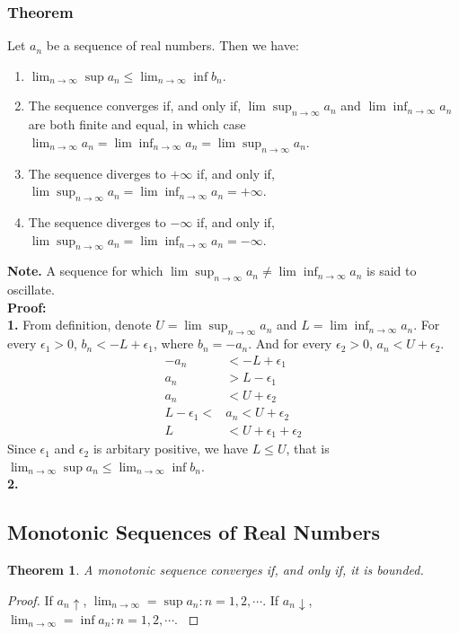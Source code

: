 \documentclass{article}
\newtheorem{theorem}{Theorem}[section]
\begin{document}
\subsubsection{Theorem}
Let $a_{n}$ be a sequence of real numbers. Then we have:
\begin{enumerate}
    \item $\lim_{n\rightarrow \infty}\sup a_{n}\leq\lim_{n\rightarrow \infty}\inf b_{n}$.
    \item The sequence converges if, and only if, $\lim\sup_{n\rightarrow \infty}a_{n}$ and 
    $\lim\inf_{n\rightarrow \infty}a_{n}$ are both finite and equal, in which case 
    $\lim_{n\rightarrow \infty}a_{n}=\lim\inf_{n\rightarrow \infty}a_{n}=\lim\sup_{n\rightarrow \infty}a_{n}$.
    \item The sequence diverges to $+\infty$ if, and only if, $\lim\sup_{n\rightarrow \infty}a_{n}=\lim\inf_{n\rightarrow \infty}a_{n}=+\infty$.
    \item The sequence diverges to $-\infty$ if, and only if, $\lim\sup_{n\rightarrow \infty}a_{n}=\lim\inf_{n\rightarrow \infty}a_{n}=-\infty$.
\end{enumerate}
\textbf{Note.} A sequence for which $\lim\sup_{n\rightarrow \infty}a_{n}\neq\lim\inf_{n\rightarrow \infty}a_{n} $ is said to oscillate.\\
\textbf{Proof:}\\
\textbf{1.}
From definition, denote $U=\lim\sup_{n\rightarrow \infty}a_{n}$ and $L=\lim\inf_{n\rightarrow \infty}a_{n}$.
For every $\epsilon_{1}>0$, $b_{n}<-L+\epsilon_{1}$, where $b_{n}=-a_{n}$. And for every $\epsilon_{2}>0$, $a_{n}<U+\epsilon_{2}$.
\begin{align*}
    -a_{n} &< -L + \epsilon_{1} \\
    a_{n} &> L - \epsilon_{1} \\
    a_{n} &< U + \epsilon_{2} \\
    L - \epsilon_{1} < &a_{n} < U + \epsilon_{2} \\
    L &< U + \epsilon_{1} + \epsilon_{2}
\end{align*}
Since $\epsilon_{1}$ and $\epsilon_{2}$ is arbitary positive, 
we have $L\leq U$, that is $\lim_{n\rightarrow \infty}\sup a_{n}\leq\lim_{n\rightarrow \infty}\inf b_{n}$.\\
\textbf{2.}

\subsection{Monotonic Sequences of Real Numbers}
\begin{theorem}
    A monotonic sequence converges if, and only if, it is bounded.
\end{theorem}
\begin{proof}
    If $a_{n}\uparrow$, $\lim_{n\rightarrow \infty}=\sup {a_{n}:n=1,2,\cdots}.$ If 
    $a_{n}\downarrow$, $\lim_{n\rightarrow \infty}=\inf {a_{n}:n=1,2,\cdots}.$
\label{thm:monotoinc}
\end{proof}
\end{document}
